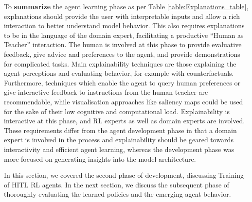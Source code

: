 \documentclass[twoside,11pt]{article}
\begin{document}
\noindent To \textbf{summarize} the agent learning phase as per Table \ref{table:Explanations_table}, explanations should provide the user with interpretable inputs and allow a rich interaction to better understand model behavior. This also requires explanations to be in the language of the domain expert, facilitating a productive ``Human as Teacher'' interaction. The human is involved at this phase to provide evaluative feedback, give advice and preferences to the agent, and provide demonstrations for complicated tasks. Main explainability techniques are those explaining the agent perceptions and evaluating behavior, for example with counterfactuals. Furthermore, techniques which enable the agent to query human preferences or give interactive feedback to instructions from the human teacher are recommendable, while visualisation approaches like saliency maps could be used for the sake of their low cognitive and computational load. Explainability is interactive at this phase, and RL experts as well as domain experts are involved. These requirements differ from the agent development phase in that a domain expert is involved in the process and explainability should be geared towards interactivity and efficient agent learning, whereas the development phase was more focused on generating insights into the model architecture.

In this section, we covered the second phase of development, discussing Training of HITL RL agents. In the next section, we discuss the subsequent phase of thoroughly evaluating the learned policies and the emerging agent behavior. 
\end{document}

